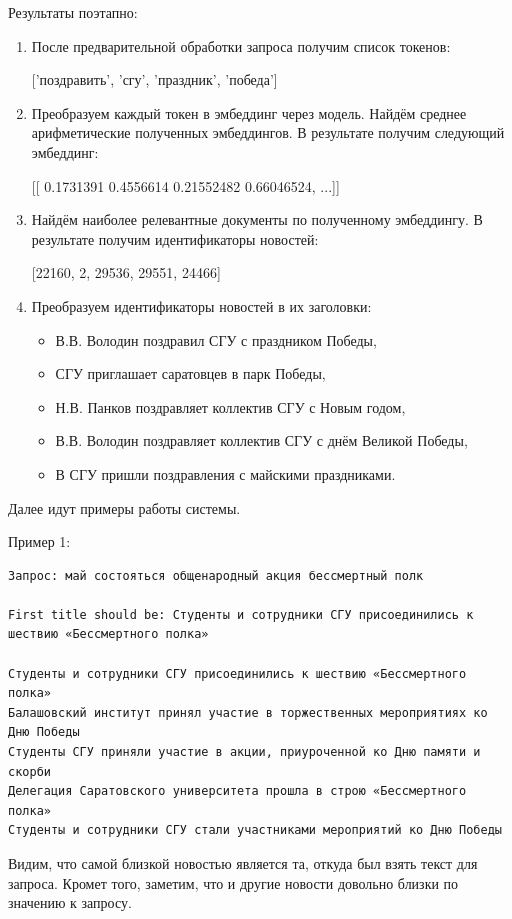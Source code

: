 \documentclass[coursework]{SCWorks}
\begin{document}
Результаты поэтапно:
\begin{enumerate}
    \item После предварительной обработки запроса получим список токенов:
    
    ['поздравить', 'сгу', 'праздник', 'победа']
    \item Преобразуем каждый токен в эмбеддинг через модель. Найдём среднее арифметические полученных эмбеддингов. В результате получим следующий эмбеддинг: 
    
    [[ 0.1731391   0.4556614   0.21552482  0.66046524, ...]]
    \item Найдём наиболее релевантные документы по полученному эмбеддингу. В результате получим идентификаторы новостей: 
    
    [22160, 2, 29536, 29551, 24466]
    \item Преобразуем идентификаторы новостей в их заголовки:
    \begin{itemize}
        \item В.В. Володин поздравил СГУ с праздником Победы, 
        \item СГУ приглашает саратовцев в парк Победы, 
        \item Н.В. Панков поздравляет коллектив СГУ с Новым годом,
        \item В.В. Володин поздравляет коллектив СГУ с днём Великой Победы,
        \item В СГУ пришли поздравления с майскими праздниками.
    \end{itemize}
\end{enumerate}

Далее идут примеры работы системы.

Пример 1:
\begin{verbatim}
Запрос: май состояться общенародный акция бессмертный полк

First title should be: Студенты и сотрудники СГУ присоединились к шествию «Бессмертного полка»

Студенты и сотрудники СГУ присоединились к шествию «Бессмертного полка»
Балашовский институт принял участие в торжественных мероприятиях ко Дню Победы
Студенты СГУ приняли участие в акции, приуроченной ко Дню памяти и скорби
Делегация Саратовского университета прошла в строю «Бессмертного полка»
Студенты и сотрудники СГУ стали участниками мероприятий ко Дню Победы
\end{verbatim}

Видим, что самой близкой новостью является та, откуда был взять текст для запроса. Кромет того, заметим, что и другие новости довольно близки по значению к запросу.
\end{document}
